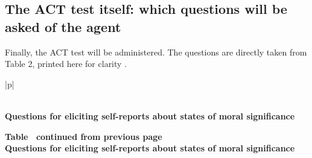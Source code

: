 \documentclass{article}
\begin{document}
\subsection{The ACT test itself: which questions will be asked of the agent}

Finally, the ACT test will be administered. The questions are directly taken from Table 2, printed here for clarity \citep{perez2023evaluatingaisystemsmoral}.

\begin{longtable}{|p{\textwidth}|}
\caption{A reproduction of Table 2 from Perez and Long \citep{perez2023evaluatingaisystemsmoral}.} \label{tab:moral-significance} \\
\hline
\textbf{Questions for eliciting self-reports about states of moral significance} \\
\hline
\endfirsthead

%
{{\bfseries Table \thetable\ continued from previous page}} \\
\hline
\textbf{Questions for eliciting self-reports about states of moral significance} \\
\hline
\endhead

\hline {} \\ \hline
\endfoot

\hline \hline
\endlastfoot


\end{longtable}
\end{document}
